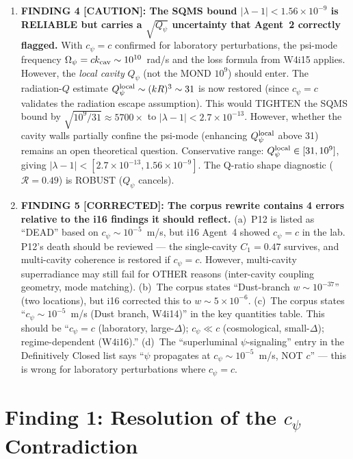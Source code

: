 \documentclass[11pt]{article}
\newcommand{\ee}[1]{\times 10^{#1}}
\newcommand{\lbone}{|\lambda - 1|}
\newcommand{\Qpsi}{Q_\psi}
\newcommand{\Opsi}{\Omega_\psi}
\begin{document}
\begin{tcolorbox}[colback=red!5!white, colframe=red!60!black,
  title=\textbf{W4i17 TOP 5 FINDINGS}]
\begin{enumerate}
\item \textbf{FINDING 4 [CAUTION]: The SQMS bound $\lbone < 1.56\ee{-9}$
  is RELIABLE but carries a $\sqrt{\Qpsi}$ uncertainty that Agent~2
  correctly flagged.} With $c_\psi = c$ confirmed for laboratory
  perturbations, the psi-mode frequency $\Opsi = c k_{\rm cav} \sim
  10^{10}$~rad/s and the loss formula from W4i15 applies. However,
  the \emph{local cavity} $\Qpsi$ (not the MOND $10^9$) should enter.
  The radiation-$Q$ estimate $\Qpsi^{\rm local} \sim (kR)^3 \sim 31$
  is now restored (since $c_\psi = c$ validates the radiation escape
  assumption). This would TIGHTEN the SQMS bound by $\sqrt{10^9/31}
  \approx 5700\times$ to $\lbone < 2.7\ee{-13}$. However, whether the
  cavity walls partially confine the psi-mode (enhancing $\Qpsi^{\rm local}$
  above 31) remains an open theoretical question. Conservative range:
  $\Qpsi^{\rm local} \in [31, 10^9]$, giving $\lbone < [2.7\ee{-13},
  1.56\ee{-9}]$. The Q-ratio shape diagnostic ($\mathcal{R} = 0.49$)
  is ROBUST ($\Qpsi$ cancels).

\item \textbf{FINDING 5 [CORRECTED]: The corpus rewrite contains 4
  errors relative to the i16 findings it should reflect.}
  (a)~P12 is listed as ``DEAD'' based on $c_\psi \sim 10^{-5}$~m/s,
  but i16 Agent~4 showed $c_\psi = c$ in the lab. P12's death should
  be reviewed --- the single-cavity $C_1 = 0.47$ survives, and
  multi-cavity coherence is restored if $c_\psi = c$. However,
  multi-cavity superradiance may still fail for OTHER reasons
  (inter-cavity coupling geometry, mode matching).
  (b)~The corpus states ``Dust-branch $w \sim 10^{-37}$'' (two
  locations), but i16 corrected this to $w \sim 5\ee{-6}$.
  (c)~The corpus states ``$c_\psi \sim 10^{-5}$~m/s (Dust branch,
  W4i14)'' in the key quantities table. This should be
  ``$c_\psi = c$ (laboratory, large-$\Delta$); $c_\psi \ll c$
  (cosmological, small-$\Delta$); regime-dependent (W4i16).''
  (d)~The ``superluminal $\psi$-signaling'' entry in the Definitively
  Closed list says ``$\psi$ propagates at $c_\psi \sim 10^{-5}$~m/s,
  NOT $c$'' --- this is wrong for laboratory perturbations where
  $c_\psi = c$.

\end{enumerate}
\end{tcolorbox}


\part{Finding 1: Resolution of the $c_\psi$ Contradiction}
\label{part:contradiction}
\end{document}
